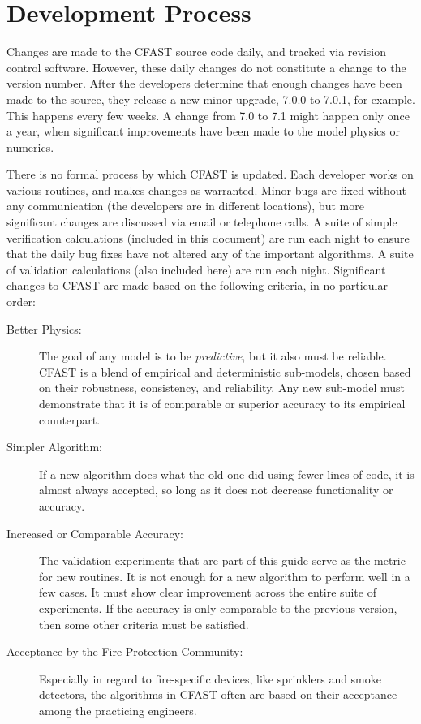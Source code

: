 \documentclass[12pt]{book}
\begin{document}
\section{Development Process}

Changes are made to the CFAST source code daily, and tracked via revision control software. However, these daily changes do not constitute a change to the version number. After the developers determine that enough changes have been made to the source, they release a new minor upgrade, 7.0.0 to 7.0.1, for example. This happens every few weeks. A change from 7.0 to 7.1 might happen only once a year, when significant improvements have been made to the model physics or numerics.

There is no formal process by which CFAST is updated. Each developer works on various routines, and makes changes as warranted. Minor bugs are fixed without any communication (the developers are in different locations), but more significant changes are discussed via email or telephone calls. A suite of simple verification calculations (included in this document) are run each night to ensure that the daily bug fixes have not altered any of the important algorithms. A suite of validation calculations (also included here) are run each night. Significant changes to CFAST are made based on the following criteria, in no particular order:
\begin{description}
\item[Better Physics:] The goal of any model is to be {\em predictive}, but it also must be reliable. CFAST is a blend of empirical and deterministic sub-models, chosen based on their robustness, consistency, and reliability. Any new sub-model must demonstrate that it is of comparable or superior accuracy to its empirical counterpart.
\item[Simpler Algorithm:] If a new algorithm does what the old one did using fewer lines of code, it is almost always accepted, so long as it does not decrease functionality or accuracy.
\item[Increased or Comparable Accuracy:] The validation experiments that are part of this guide serve as the metric for new routines. It is not enough for a new algorithm to perform well in a few cases. It must show clear improvement across the entire suite of experiments. If the accuracy is only comparable to the previous version, then some other criteria must be satisfied.
\item[Acceptance by the Fire Protection Community:] Especially in regard to fire-specific devices, like sprinklers and smoke detectors, the algorithms in CFAST often are based on their acceptance among the practicing engineers.
\end{description}
\end{document}
